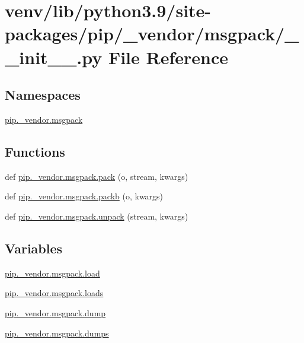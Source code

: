 \hypertarget{venv_2lib_2python3_89_2site-packages_2pip_2__vendor_2msgpack_2____init_____8py}{}\section{venv/lib/python3.9/site-\/packages/pip/\+\_\+vendor/msgpack/\+\_\+\+\_\+init\+\_\+\+\_\+.py File Reference}
\label{venv_2lib_2python3_89_2site-packages_2pip_2__vendor_2msgpack_2____init_____8py}
\subsection*{Namespaces}
\begin{DoxyCompactItemize}
\item 
 \hyperlink{namespacepip_1_1__vendor_1_1msgpack}{pip.\+\_\+vendor.\+msgpack}
\end{DoxyCompactItemize}
\subsection*{Functions}
\begin{DoxyCompactItemize}
\item 
def \hyperlink{namespacepip_1_1__vendor_1_1msgpack_a18894bccffe8100e5b40292e084b3f70}{pip.\+\_\+vendor.\+msgpack.\+pack} (o, stream, kwargs)
\item 
def \hyperlink{namespacepip_1_1__vendor_1_1msgpack_a185e16c7e8d0315d9646129bfdae88de}{pip.\+\_\+vendor.\+msgpack.\+packb} (o, kwargs)
\item 
def \hyperlink{namespacepip_1_1__vendor_1_1msgpack_ae5f486d414a6a00cec8c347726fffc42}{pip.\+\_\+vendor.\+msgpack.\+unpack} (stream, kwargs)
\end{DoxyCompactItemize}
\subsection*{Variables}
\begin{DoxyCompactItemize}
\item 
\hyperlink{namespacepip_1_1__vendor_1_1msgpack_a6ce1816b284764aeb33c6ed0fd8857b3}{pip.\+\_\+vendor.\+msgpack.\+load}
\item 
\hyperlink{namespacepip_1_1__vendor_1_1msgpack_a67b344a39036e8a7883ec7d61c3dd0c1}{pip.\+\_\+vendor.\+msgpack.\+loads}
\item 
\hyperlink{namespacepip_1_1__vendor_1_1msgpack_adb13434b0aa273b58ce5b8d2a019a210}{pip.\+\_\+vendor.\+msgpack.\+dump}
\item 
\hyperlink{namespacepip_1_1__vendor_1_1msgpack_ab14e35db24a6dc2eaf4e8279a1331953}{pip.\+\_\+vendor.\+msgpack.\+dumps}
\end{DoxyCompactItemize}
